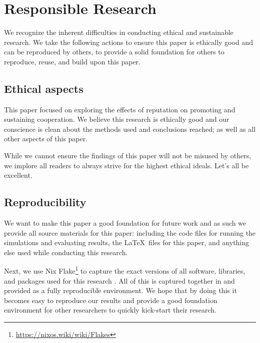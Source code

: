 \documentclass[english]{article}
\begin{document}





\section{Responsible Research}
We recognize the inherent difficulties in conducting ethical and sustainable research.
We take the following actions to ensure this paper is ethically good
and can be reproduced by others, to provide a solid foundation for others to reproduce, reuse, and build upon this paper.

\subsection{Ethical aspects}
This paper focused on exploring the effects of reputation on promoting and sustaining cooperation.
We believe this research is ethically good and our conscience is clean about the methods used and conclusions reached; as well as all other aspects of this paper.

While we cannot ensure the findings of this paper will not be misused by others, we implore all readers to always strive for the highest ethical ideals.
Let's all be excellent.

\subsection{Reproducibility}
We want to make this paper a good foundation for future work and as such we provide all source materials for this paper: including the code files for running the simulations and evaluating results, the \LaTeX\ files for this paper, and anything else used while conducting this research.

Next, we use Nix Flake\footnote{\url{https://nixos.wiki/wiki/Flakes}} to capture the exact versions of all software, libraries, and packages used for this research \citep{nix}. All of this is captured together in and provided as a fully reproducible environment.
We hope that by doing this it becomes easy to reproduce our results and provide a good foundation environment for other researchers to quickly kick-start their research.
\end{document}
